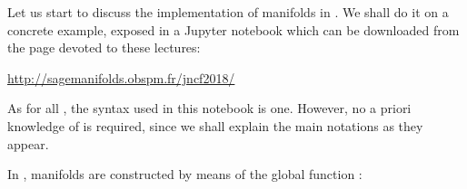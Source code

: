 Let us start to discuss the implementation of manifolds in \Sage{}. We shall
do it on a concrete example, exposed in a Jupyter notebook which can be downloaded
from the page devoted to these lectures:
\begin{center}
\url{http://sagemanifolds.obspm.fr/jncf2018/}
\end{center}
As for all \Sage{}, the syntax used in this notebook is  one. However, no
a priori knowledge of  is required, since we shall explain the
main notations as they appear.

In \Sage{}, manifolds are constructed by means of the global function :

\begin{NBin}
\end{NBin}

